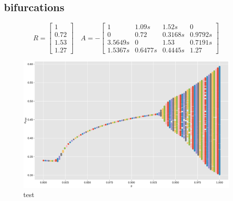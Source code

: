 \documentclass{wsdcr}
\begin{document}
\subsection{bifurcations}
\begin{equation}
R={\begin{bmatrix}1\\0.72\\1.53\\1.27\end{bmatrix}}\quad A =-{\begin{bmatrix}1&1.09s&1.52s&0\\0&0.72&0.3168s&0.9792s\\3.5649s&0&1.53&0.7191s\\1.5367s&0.6477s&0.4445s&1.27\end{bmatrix}}
\end{equation}
\begin{figure}[t!]
    \centering
    \includegraphics[width=\linewidth]{fig/lv4_bif.eps}
    \caption{test}
    \label{fig:bif4}
\end{figure}
\end{document}
